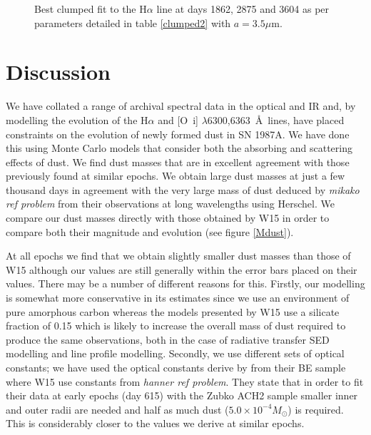 \documentclass[useAMS,usenatbib,usegraphicx]{mnras}
\begin{document}
\begin{figure}
\begin{center}
\caption{Best clumped fit to the H$\alpha$ line at days 1862, 2875 and 
3604 as per parameters detailed in table \ref{clumped2} with $a=3.5\mu$m.}
\label{d1862_3604_cmax}
\end{center}
\end{figure}

\section{Discussion}
\label{discuss}

We have collated a range of archival spectral data in the optical and IR 
and, by modelling the evolution of the H$\alpha$ and 
[O~{\sc i}] $\lambda$6300,6363~\AA\ lines, have placed constraints on the 
evolution of newly formed dust in SN 1987A. We have done this using Monte Carlo 
models that consider both the absorbing and scattering effects of dust.  
We find dust masses that are in excellent agreement with those previously 
found at similar epochs.  We obtain large dust masses at just a few 
thousand days in agreement with the very large mass of dust deduced by 
\textit{mikako ref problem} from their observations at long wavelengths 
using Herschel. We compare our dust masses directly with those obtained by 
W15 in order to compare both their magnitude and evolution (see figure 
\ref{Mdust}).

At all epochs we find that we obtain slightly smaller dust masses than 
those of W15 although our values are still generally within the error bars 
placed on their values.  There may be a number of different reasons for 
this.  Firstly, our modelling is somewhat more conservative in its 
estimates since we use an environment of pure amorphous carbon whereas the 
models presented by W15 use a silicate fraction of 0.15 which is likely to 
increase the overall mass of dust required to produce the same 
observations, both in the case of radiative transfer SED modelling and 
line profile modelling.  Secondly, we use different sets of optical 
constants; we have used the optical constants derive by \cite{Zubko1996} 
from their BE sample where W15 use constants from 
\cite{Hanner1988}\textit{hanner ref problem}.  They state that in order to 
fit their data at early epochs (day 615) with the Zubko ACH2 sample 
smaller inner and outer radii are needed and half as much dust ($5.0 
\times 10^{-4}M_{\odot}$) is required.  This is considerably closer to the 
values we derive at similar epochs.
\end{document}
